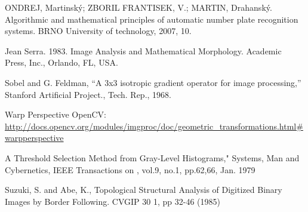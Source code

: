 
\begin{thebibliography}{99}

 ONDREJ, Martinský; ZBORIL FRANTISEK, V.; MARTIN, Drahanský. 
Algorithmic and mathematical principles of automatic number plate recognition systems. 
BRNO University of technology, 2007, 10.

 Jean Serra. 1983. Image Analysis and Mathematical Morphology. Academic Press, Inc., Orlando, FL, USA.

 Sobel and G. Feldman, “A 3x3 isotropic gradient operator for image processing,” Stanford Artificial Project., Tech. Rep., 1968.

 Warp Perspective OpenCV:\\
  \url{http://docs.opencv.org/modules/imgproc/doc/geometric_transformations.html#warpperspective}

 A Threshold Selection Method from Gray-Level Histograms," Systems, Man and Cybernetics, IEEE Transactions on , vol.9, no.1, pp.62,66, Jan. 1979

 Suzuki, S. and Abe, K., Topological Structural Analysis of Digitized Binary Images by Border Following. CVGIP 30 1, pp 32-46 (1985)


\end{thebibliography}

\vfill
